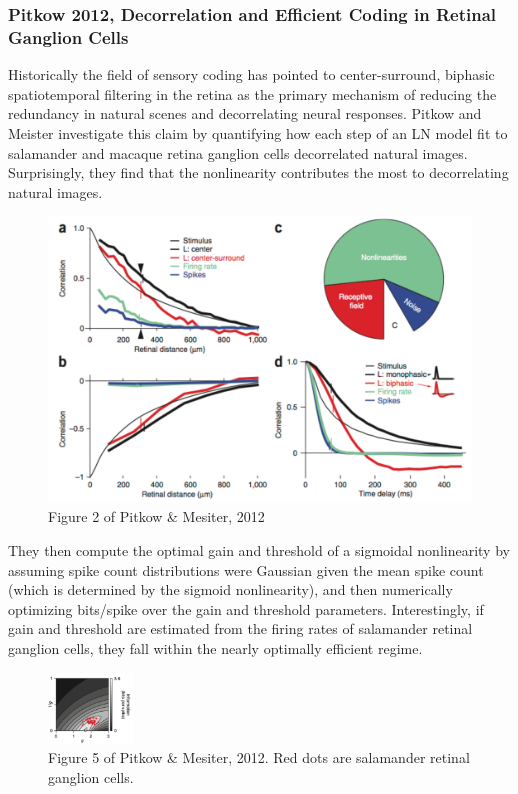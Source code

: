 \documentclass{article}
\begin{document}
\subsubsection{Pitkow 2012, Decorrelation and Efficient Coding in Retinal Ganglion Cells}
Historically the field of sensory coding has pointed to center-surround, biphasic spatiotemporal filtering in the retina as the primary mechanism of reducing the redundancy in natural scenes and decorrelating neural responses.  Pitkow and Meister investigate this claim by quantifying how each step of an LN model fit to salamander and macaque retina ganglion cells decorrelated natural images.  Surprisingly, they find that the nonlinearity contributes the most to decorrelating natural images. 

\begin{figure}
\includegraphics[width=\textwidth]{Pitkow2012_fig2_cropped.pdf}
\caption*{Figure 2 of Pitkow \& Mesiter, 2012}
\end{figure}
They then compute the optimal gain and threshold of a sigmoidal nonlinearity by assuming spike count distributions were Gaussian given the mean spike count (which is determined by the sigmoid nonlinearity), and then numerically optimizing bits/spike over the gain and threshold parameters.  Interestingly, if gain and threshold are estimated from the firing rates of salamander retinal ganglion cells, they fall within the nearly optimally efficient regime.
\begin{figure}
\centering
\includegraphics[width=0.2\textwidth]{Pitkow2012_fig5.pdf}
\caption*{Figure 5 of Pitkow \& Mesiter, 2012.  Red dots are salamander retinal ganglion cells.}
\end{figure}
\end{document}
